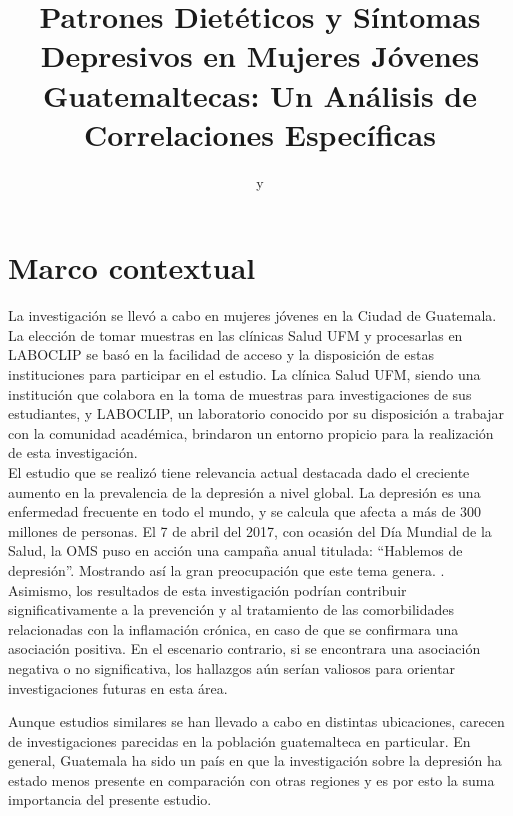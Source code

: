\documentclass[jou]{apa7}
\title{Patrones Dietéticos y Síntomas Depresivos en Mujeres Jóvenes Guatemaltecas: Un Análisis de Correlaciones Específicas}
\author{\addORCIDlink{Dra. Camila Heredia}{0009-0008-9550-9083} y \addORCIDlink{Licda. María Andrée Neumann}{0009-0001-2531-6058 }}
\affiliation{Escuela de Postgrado, Universidad Francisco Marroquín}
\begin{document}
	\maketitle



	\section{Marco contextual}\label{marco-contextual}

	La investigación se llevó a cabo en mujeres jóvenes en la Ciudad de
	Guatemala. La elección de tomar muestras en las clínicas Salud UFM y
	procesarlas en LABOCLIP se basó en la facilidad de acceso y la
	disposición de estas instituciones para participar en el estudio. La
	clínica Salud UFM, siendo una institución que colabora en la toma de
	muestras para investigaciones de sus estudiantes, y LABOCLIP, un
	laboratorio conocido por su disposición a trabajar con la comunidad
	académica, brindaron un entorno propicio para la realización de esta
	investigación.\\

	El estudio que se realizó tiene relevancia actual destacada dado el
	creciente aumento en la prevalencia de la depresión a nivel global. La
	depresión es una enfermedad frecuente en todo el mundo, y se calcula que
	afecta a más de 300 millones de personas. El 7 de abril del 2017, con
	ocasión del Día Mundial de la Salud, la OMS puso en acción una campaña
	anual titulada: ``Hablemos de depresión''. Mostrando así la gran
	preocupación que este tema genera. \parencite{Toshi2022}.\\

	Asimismo, los resultados de esta investigación podrían contribuir
	significativamente a la prevención y al tratamiento de las
	comorbilidades relacionadas con la inflamación crónica, en caso de que
	se confirmara una asociación positiva. En el escenario contrario, si se
	encontrara una asociación negativa o no significativa, los hallazgos aún
	serían valiosos para orientar investigaciones futuras en esta área.

	Aunque estudios similares se han llevado a cabo en distintas
	ubicaciones, carecen de investigaciones parecidas en la población
	guatemalteca en particular. En general, Guatemala ha sido un país en que
	la investigación sobre la depresión ha estado menos presente en
	comparación con otras regiones y es por esto la suma importancia del
	presente estudio.\\
\end{document}
